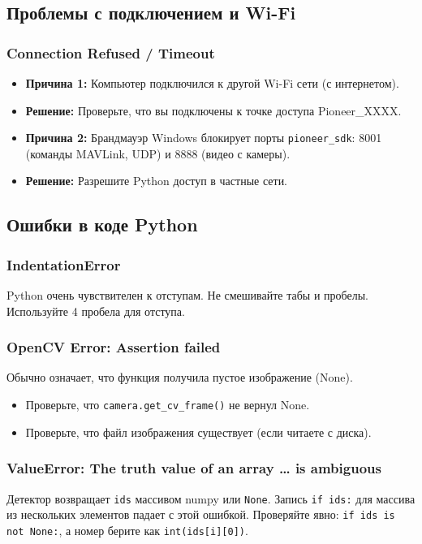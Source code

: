 \subsection{Проблемы с подключением и Wi-Fi}

\subsubsection{Connection Refused / Timeout}
\begin{itemize}
    \item \textbf{Причина 1:} Компьютер подключился к другой Wi-Fi сети (с интернетом).
    \item \textbf{Решение:} Проверьте, что вы подключены к точке доступа Pioneer\_XXXX.
    
    \item \textbf{Причина 2:} Брандмауэр Windows блокирует порты \texttt{pioneer\_sdk}: 8001 (команды MAVLink, UDP) и 8888 (видео с камеры).
    \item \textbf{Решение:} Разрешите Python доступ в частные сети.
\end{itemize}

\subsection{Ошибки в коде Python}

\subsubsection{IndentationError}
Python очень чувствителен к отступам. Не смешивайте табы и пробелы. Используйте 4 пробела для отступа.

\subsubsection{OpenCV Error: Assertion failed}
Обычно означает, что функция получила пустое изображение (None).
\begin{itemize}
    \item Проверьте, что \texttt{camera.get\_cv\_frame()} не вернул None.
    \item Проверьте, что файл изображения существует (если читаете с диска).
\end{itemize}

\subsubsection{ValueError: The truth value of an array \dots{} is ambiguous}
Детектор возвращает \texttt{ids} массивом numpy или \texttt{None}. Запись \verb|if ids:| для массива из нескольких элементов падает с этой ошибкой. Проверяйте явно: \verb|if ids is not None:|, а номер берите как \verb|int(ids[i][0])|.

